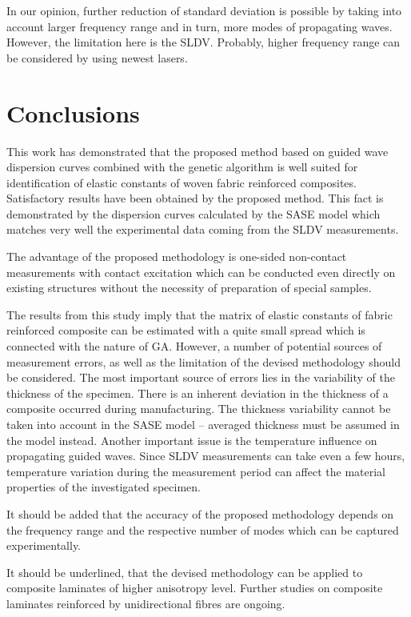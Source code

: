 \documentclass[preprint,12pt]{elsarticle}
\begin{document}
In our opinion, further reduction of standard deviation is possible by taking into account larger frequency range and in turn, more modes of propagating waves. However, the limitation here is the SLDV. Probably, higher frequency range can be considered by using newest lasers. 
\clearpage	%
\section{Conclusions}
This work has demonstrated that the proposed method based on guided wave dispersion curves combined with the genetic algorithm is well suited for identification of elastic constants of woven fabric reinforced composites.
Satisfactory results have been obtained by the proposed method. 
This fact is demonstrated by the dispersion curves calculated by the SASE model which matches very well the experimental data coming from the SLDV measurements. 
	
The advantage of the proposed methodology is one-sided non-contact measurements with contact excitation which can be conducted even directly on existing structures without the necessity of preparation of special samples.
	
The results from this study imply that the matrix of elastic constants of fabric reinforced composite can be estimated with a quite small spread which is connected with the nature of GA. 
However, a number of potential sources of measurement errors, as well as the limitation of the devised methodology should be considered. 
The most important source of errors lies in the variability of the thickness of the specimen. 
There is an inherent deviation in the thickness of a composite occurred during manufacturing. 
The thickness variability cannot be taken into account in the SASE model -- averaged thickness must be assumed in the model instead. 
Another important issue is the temperature influence on propagating guided waves.
Since SLDV measurements can take even a few hours, temperature variation during the measurement period can affect the material properties of the investigated specimen. 

It should be added that the accuracy of the proposed methodology depends on the frequency range and the respective number of modes which can be captured experimentally.
	
It should be underlined, that the devised methodology can be applied to composite laminates of higher anisotropy level. Further studies on composite laminates reinforced by unidirectional fibres are ongoing.
\end{document}
